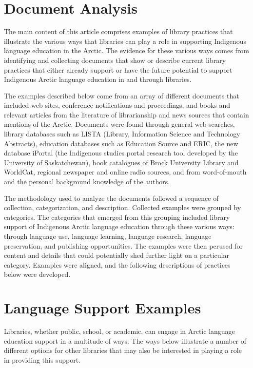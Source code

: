 \documentclass[a4paper,
fontsize=11pt,
oneside,
numbers=noperiodatend,
parskip=half-,
bibliography=totoc,
final
]{scrartcl}
\begin{document}
\hypertarget{document-analysis}{%
\section{Document Analysis}\label{document-analysis}}

The main content of this article comprises examples of library practices
that illustrate the various ways that libraries can play a role in
supporting Indigenous language education in the Arctic. The evidence for
these various ways comes from identifying and collecting documents that
show or describe current library practices that either already support
or have the future potential to support Indigenous Arctic language
education in and through libraries.

The examples described below come from an array of different documents
that included web sites, conference notifications and proceedings, and
books and relevant articles from the literature of librarianship and
news sources that contain mentions of the Arctic. Documents were found
through general web searches, library databases such as LISTA (Library,
Information Science and Technology Abstracts), education databases such
as Education Source and ERIC, the new database iPortal (the Indigenous
studies portal research tool developed by the University of
Saskatchewan), book catalogues of Brock University Library and WorldCat,
regional newspaper and online radio sources, and from word-of-mouth and
the personal background knowledge of the authors.

The methodology used to analyze the documents followed a sequence of
collection, categorization, and description. Collected examples were
grouped by categories. The categories that emerged from this grouping
included library support of Indigenous Arctic language education through
these various ways: through language use, language learning, language
research, language preservation, and publishing opportunities. The
examples were then perused for content and details that could
potentially shed further light on a particular category. Examples were
aligned, and the following descriptions of practices below were
developed.

\hypertarget{language-support-examples}{%
\section{Language Support Examples}\label{language-support-examples}}

Libraries, whether public, school, or academic, can engage in Arctic
language education support in a multitude of ways. The ways below
illustrate a number of different options for other libraries that may
also be interested in playing a role in providing this support.
\end{document}
